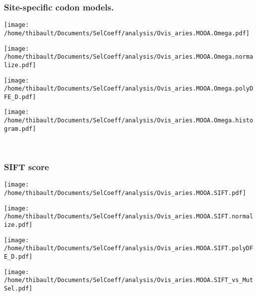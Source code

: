 \subsubsection*{Site-specific codon models.} 
\begin{minipage}{0.49\linewidth} 
\texttt{[image: /home/thibault/Documents/SelCoeff/analysis/Ovis\_aries.MOOA.Omega.pdf]} 
\end{minipage}
\begin{minipage}{0.49\linewidth} 
\texttt{[image: /home/thibault/Documents/SelCoeff/analysis/Ovis\_aries.MOOA.Omega.normalize.pdf]} 
\end{minipage}
\begin{minipage}{0.49\linewidth} 
\texttt{[image: /home/thibault/Documents/SelCoeff/analysis/Ovis\_aries.MOOA.Omega.polyDFE\_D.pdf]} 
\end{minipage}
\begin{minipage}{0.49\linewidth} 
\texttt{[image: /home/thibault/Documents/SelCoeff/analysis/Ovis\_aries.MOOA.Omega.histogram.pdf]} 
\end{minipage}
\\ 
\subsubsection*{SIFT score} 
\begin{minipage}{0.49\linewidth} 
\texttt{[image: /home/thibault/Documents/SelCoeff/analysis/Ovis\_aries.MOOA.SIFT.pdf]} 
\end{minipage}
\begin{minipage}{0.49\linewidth} 
\texttt{[image: /home/thibault/Documents/SelCoeff/analysis/Ovis\_aries.MOOA.SIFT.normalize.pdf]} 
\end{minipage}
\begin{minipage}{0.49\linewidth} 
\texttt{[image: /home/thibault/Documents/SelCoeff/analysis/Ovis\_aries.MOOA.SIFT.polyDFE\_D.pdf]} 
\end{minipage}
\begin{minipage}{0.49\linewidth} 
\texttt{[image: /home/thibault/Documents/SelCoeff/analysis/Ovis\_aries.MOOA.SIFT\_vs\_MutSel.pdf]} 
\end{minipage}
\\ 
